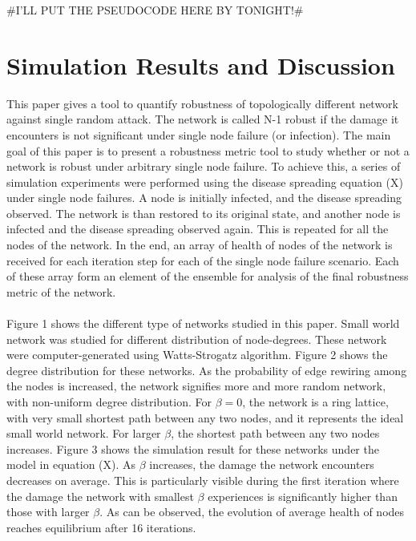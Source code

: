\documentclass[11pt]{article}
\begin{document}
\#I'LL PUT THE PSEUDOCODE HERE BY TONIGHT!\#

\newpage
\section{Simulation Results and Discussion}
This paper gives a tool to quantify robustness of topologically different network against single random attack. The network is called N-1 robust if the damage it encounters is not significant under single node failure (or infection). The main goal of this paper is to present a robustness metric tool to study whether or not a network is robust under arbitrary single node failure. To achieve this, a series of simulation experiments were performed using the disease spreading equation (X) under single node failures. A node is initially infected, and the disease spreading observed. The network is than restored to its original state, and another node is infected and the disease spreading observed again. This is repeated for all the nodes of the network. In the end, an array of health of nodes of the network is received for each iteration step for each of the single node failure scenario. Each of these array form an element of the ensemble for analysis of the final robustness metric of the network. \\
\\
Figure 1 shows the different type of networks studied in this paper. Small world network was studied for different distribution of node-degrees. These network were computer-generated using Watts-Strogatz algorithm. Figure 2 shows the degree distribution for these networks. As the probability of edge rewiring among the nodes is increased, the network signifies more and more random network, with non-uniform degree distribution. For $\beta=0$, the network is a ring lattice, with very small shortest path between any two nodes, and it represents the ideal small world network. For larger $\beta$, the shortest path between any two nodes increases. Figure 3 shows the simulation result for these networks under the model in equation (X). As $\beta$ increases, the damage the network encounters decreases on average. This is particularly visible during the first iteration where the damage the network with smallest $\beta$ experiences is significantly higher than those with larger $\beta$. As can be observed, the evolution of average health of nodes reaches equilibrium after 16 iterations. 
\end{document}
